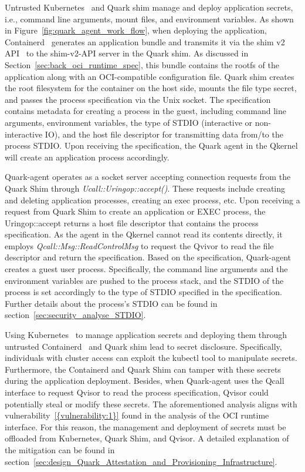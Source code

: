 Untrusted Kubernetes~\cite*{k8s} and Quark shim manage and deploy application secrets, i.e., command line arguments, mount files, and environment variables. As shown in Figure~\ref{fig:quark_agent_work_flow}, when deploying the application, Containerd~\cite*{containerd} generates an application bundle and transmits it via the shim v2 API~\cite*{shim_v2} to the shim-v2-API server in the Quark shim. 
As discussed in Section~\ref{sec:back_oci_runtime_spec}, this bundle contains the rootfs of the application along with an OCI-compatible configuration file. Quark shim creates the root filesystem for the container on the host side, mounts the file type secret, and passes the process specification via the Unix socket. The specification contains metadata for creating a process in the guest, including command line 
arguments, environment variables, the type of STDIO (interactive or non-interactive IO), and the host file descriptor for transmitting data from/to the process STDIO. Upon receiving the specification, the Quark agent in the Qkernel will create an application process accordingly.


Quark-agent operates as a socket server accepting connection requests from the Quark Shim through \emph{Ucall::Uringop::accept()}. These requests include creating and deleting application processes, creating an exec process, etc. Upon receiving a request from Quark Shim to create an application or EXEC process, the Uringop::accept returns a host file descriptor 
that contains the process specification. As the agent in the Qkernel cannot read its contents directly, it employs \emph{Qcall::Msg::ReadControlMsg} to request the Qvivor to read the file descriptor and return the specification. Based on the specification, Quark-agent creates a guest user process. Specifically, the command line arguments and the environment variables 
are pushed to the process stack, and the STDIO of the process is set accordingly to the type of STDIO specified in the specification. Further details about the process's STDIO can be found in section~\ref{sec:security_analyse_STDIO}.


Using Kubernetes~\cite*{k8s} to manage application secrets and deploying them through untrusted Containerd~\cite*{containerd} and Quark shim lead to secret disclosure. Specifically, individuals with cluster access can exploit the kubectl tool to manipulate secrets. Furthermore, the Containerd and Quark Shim can tamper with these secrets during the application deployment. Besides, 
when Quark-agent uses the Qcall interface to request Qvisor to read the process specification, Qvisor could potentially steal or modify these secrets.  The aforementioned analysis aligns with vulnerability~\ref{{vulnerability:1}} found in the analysis of the OCI runtime interface. For this reason, the management and deployment of secrets must be offloaded from Kubernetes, Quark Shim, 
and Qvisor. A detailed explanation of the mitigation can be found in section~\ref{sec:design_Quark_Attestation_and_Provisioning_Infrastructure}.


